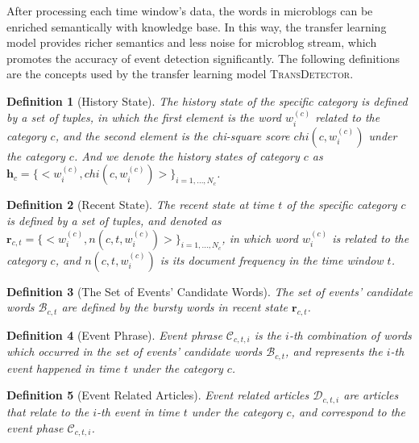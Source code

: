 \documentclass{article}
\newtheorem{rmk}{Definition}%
\begin{document}
After processing each time window's data, the words in microblogs can be enriched semantically with knowledge base.
In this way, the transfer learning model provides richer semantics and less noise for microblog stream, which promotes the accuracy of event detection significantly. 
The following definitions are the concepts used by the transfer learning model \textsc{TransDetector}. 

\begin{rmk}[History State] 
The history state of the specific category is defined by a set of tuples, in which the first element is the word \(w^{(c)}_i\) related to the category \(c\), and the second element is the chi-square score \(chi(c,w^{(c)}_{i})\) under the category \(c\). 
And we denote the history states of category \(c\) as \(\bm{h}_c=\{<w^{(c)}_i,chi(c,w^{(c)}_{i})>\}_{i=1,...,N_c}\).
\end{rmk}

\begin{rmk}[Recent State] 
The recent state at time \(t\) of the specific category \(c\) is defined by a set of tuples, and denoted as \(\bm{r}_{c,t}=\{<w^{(c)}_i,n(c,t,w^{(c)}_{i})>\}_{i=1,...,N_c}\), in which word \(w^{(c)}_{i}\) is related to the category \(c\), and \(n(c,t,w^{(c)}_{i})\) is its document frequency in the time window \(t\).
\end{rmk}

\begin{rmk}[The Set of Events' Candidate Words] 
The set of events' candidate words \(\mathcal{B}_{c,t}\) are defined by the bursty words in recent state \(\bm{r}_{c,t}\).
\end{rmk}

\begin{rmk}[Event Phrase] 
Event phrase \(\mathcal{C}_{c,t,i}\) is the \(i\)-th combination of words which occurred in the set of events' candidate words \(\mathcal{B}_{c,t}\), and represents the \(i\)-th event happened in time \(t\) under the category \(c\).
\end{rmk}

\begin{rmk}[Event Related Articles] Event related articles \(\mathcal{D}_{c,t,i}\) are articles that relate to the \(i\)-th event in time \(t\) under the category \(c\), and correspond to the event phase \(\mathcal{C}_{c,t,i}\).
\end{rmk}
\end{document}
